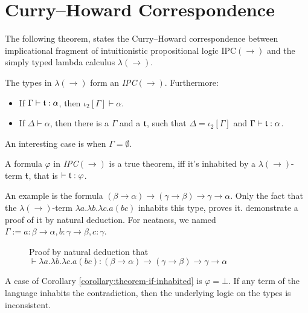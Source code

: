 \section{Curry--Howard Correspondence}

The following theorem, states the Curry--Howard correspondence between implicational fragment of intuitionistic propositional logic IPC$(\rightarrow)$ and the simply typed lambda calculus $\lambda(\rightarrow)$.

\begin{theorem}
The types in $\lambda(\rightarrow)$ form an \emph{IPC}$(\rightarrow)$. Furthermore:
\begin{itemize}
    \item If $\Gamma \vdash \mathfrak{t} : \alpha$, then $\iota_2[\Gamma] \vdash \alpha$.
    \item If $\Delta \vdash \alpha$, then there is a $\Gamma$ and a $\mathfrak{t}$, such that $\Delta = \iota_2[\Gamma]$ and $\Gamma \vdash \mathfrak{t} : \alpha$. \qedhere
\end{itemize}
\end{theorem}

An interesting case is when $\Gamma = \emptyset$.

\begin{corollary}
\label{corollary:theorem-if-inhabited}
A formula $\varphi$ in \emph{IPC}$(\rightarrow)$ is a true theorem, iff it's inhabited by a $\lambda(\rightarrow)$-term $\mathfrak{t}$, that is $\vdash \mathfrak{t} : \varphi$.
\end{corollary}

An example is the formula $(\beta \rightarrow \alpha) \rightarrow (\gamma \rightarrow \beta) \rightarrow \gamma \rightarrow \alpha$. Only the fact that the $\lambda(\rightarrow)$-term $\lambda a. \lambda b. \lambda c. a (b c)$ inhabits this type, proves it.  demonstrate a proof of it by natural deduction. For neatness, we named $\Gamma := a : \beta \rightarrow \alpha, b : \gamma \rightarrow \beta, c : \gamma$.

\begin{figure}
    \centering
    
    \caption{Proof by natural deduction that $\vdash \lambda a. \lambda b. \lambda c. a (b c) : (\beta \rightarrow \alpha) \rightarrow (\gamma \rightarrow \beta) \rightarrow \gamma \rightarrow \alpha$}
    \label{fig:curry-howard-example}
\end{figure}

A case of Corollary \ref{corollary:theorem-if-inhabited} is $\varphi = \bot$. If any term of the language inhabits the contradiction, then the underlying logic on the types is inconsistent.